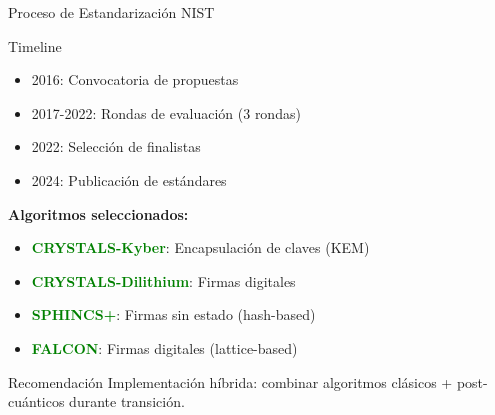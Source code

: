\documentclass[aspectratio=169]{beamer}
\begin{document}
\begin{frame}{Proceso de Estandarización NIST}
\begin{block}{Timeline}
\begin{itemize}
\item 2016: Convocatoria de propuestas
\item 2017-2022: Rondas de evaluación (3 rondas)
\item 2022: Selección de finalistas
\item 2024: Publicación de estándares
\end{itemize}
\end{block}

\vspace{0.3cm}
\textbf{Algoritmos seleccionados:}
\begin{itemize}
\item \textcolor{green}{\textbf{CRYSTALS-Kyber}}: Encapsulación de claves (KEM)
\item \textcolor{green}{\textbf{CRYSTALS-Dilithium}}: Firmas digitales
\item \textcolor{green}{\textbf{SPHINCS+}}: Firmas sin estado (hash-based)
\item \textcolor{green}{\textbf{FALCON}}: Firmas digitales (lattice-based)
\end{itemize}

\begin{alertblock}{Recomendación}
Implementación híbrida: combinar algoritmos clásicos + post-cuánticos durante transición.
\end{alertblock}
\end{frame}
\end{document}
